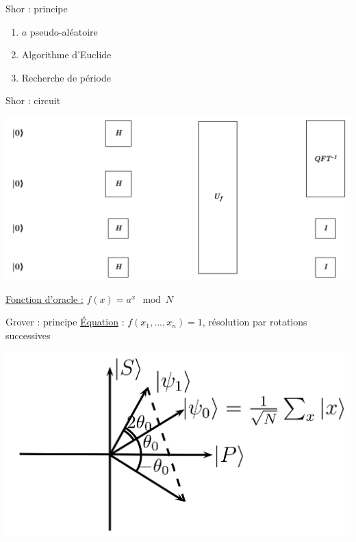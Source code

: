 \documentclass[french]{beamer}
\begin{document}
\begin{frame}{Shor : principe}
    \begin{enumerate}
        \item $a$ pseudo-aléatoire
        \item Algorithme d'Euclide
        \item Recherche de période
    \end{enumerate}
\end{frame}

\begin{frame}{Shor : circuit}
    \begin{center}
        \includegraphics[scale=0.17]{ShorInterface.png}
    \end{center}
    \underline{Fonction d'oracle :} $f(x) = a^x \mod N$
\end{frame}

\begin{frame}{Grover : principe}
    \underline{Équation} : $f(x_1, ..., x_n) = 1$, résolution par rotations successives
    \begin{center}
        \includegraphics[scale=0.1]{Rotations.png}
    \end{center}
\end{frame}
\end{document}
